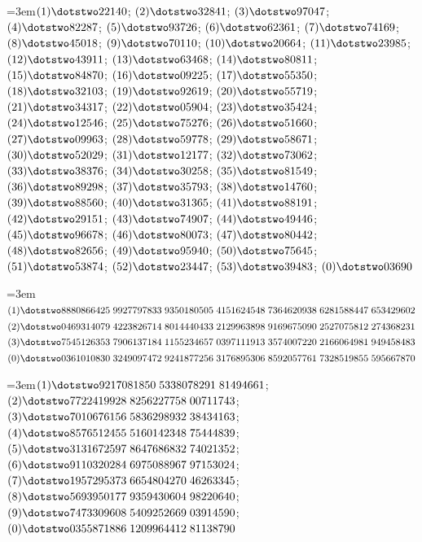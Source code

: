 \par\noindent\hangindent=3em\enspace $(1)\dotstwo22140$; $(2)\dotstwo32841$; $(3)\dotstwo97047$; $(4)\dotstwo82287$; $(5)\dotstwo93726$; $(6)\dotstwo62361$; $(7)\dotstwo74169$; $(8)\dotstwo45018$; $(9)\dotstwo70110$; $(10)\dotstwo20664$; $(11)\dotstwo23985$; $(12)\dotstwo43911$; $(13)\dotstwo63468$; $(14)\dotstwo80811$; $(15)\dotstwo84870$; $(16)\dotstwo09225$; $(17)\dotstwo55350$; $(18)\dotstwo32103$; $(19)\dotstwo92619$; $(20)\dotstwo55719$; $(21)\dotstwo34317$; $(22)\dotstwo05904$; $(23)\dotstwo35424$; $(24)\dotstwo12546$; $(25)\dotstwo75276$; $(26)\dotstwo51660$; $(27)\dotstwo09963$; $(28)\dotstwo59778$; $(29)\dotstwo58671$; $(30)\dotstwo52029$; $(31)\dotstwo12177$; $(32)\dotstwo73062$; $(33)\dotstwo38376$; $(34)\dotstwo30258$; $(35)\dotstwo81549$; $(36)\dotstwo89298$; $(37)\dotstwo35793$; $(38)\dotstwo14760$; $(39)\dotstwo88560$; $(40)\dotstwo31365$; $(41)\dotstwo88191$; $(42)\dotstwo29151$; $(43)\dotstwo74907$; $(44)\dotstwo49446$; $(45)\dotstwo96678$; $(46)\dotstwo80073$; $(47)\dotstwo80442$; $(48)\dotstwo82656$; $(49)\dotstwo95940$; $(50)\dotstwo75645$; $(51)\dotstwo53874$; $(52)\dotstwo23447$; $(53)\dotstwo39483$; $(0)\dotstwo03690$\par\smallskip

\par\noindent\hangindent=3em\enspace $(1)\dotstwo8880866425\;\allowbreak 9927797833\;\allowbreak 9350180505\;\allowbreak 4151624548\;\allowbreak 7364620938\;\allowbreak 6281588447\;\allowbreak 653429602$ $(2)\dotstwo0469314079\;\allowbreak 4223826714\;\allowbreak 8014440433\;\allowbreak 2129963898\;\allowbreak 9169675090\;\allowbreak 2527075812\;\allowbreak 274368231$ $(3)\dotstwo7545126353\;\allowbreak 7906137184\;\allowbreak 1155234657\;\allowbreak 0397111913\;\allowbreak 3574007220\;\allowbreak 2166064981\;\allowbreak 949458483$ $(0)\dotstwo0361010830\;\allowbreak 3249097472\;\allowbreak 9241877256\;\allowbreak 3176895306\;\allowbreak 8592057761\;\allowbreak 7328519855\;\allowbreak 595667870$\par\smallskip

\par\noindent\hangindent=3em\enspace $(1)\dotstwo9217081850\;\allowbreak 5338078291\;\allowbreak 81494661$; $(2)\dotstwo7722419928\;\allowbreak 8256227758\;\allowbreak 00711743$; $(3)\dotstwo7010676156\;\allowbreak 5836298932\;\allowbreak 38434163$; $(4)\dotstwo8576512455\;\allowbreak 5160142348\;\allowbreak 75444839$; $(5)\dotstwo3131672597\;\allowbreak 8647686832\;\allowbreak 74021352$; $(6)\dotstwo9110320284\;\allowbreak 6975088967\;\allowbreak 97153024$; $(7)\dotstwo1957295373\;\allowbreak 6654804270\;\allowbreak 46263345$; $(8)\dotstwo5693950177\;\allowbreak 9359430604\;\allowbreak 98220640$; $(9)\dotstwo7473309608\;\allowbreak 5409252669\;\allowbreak 03914590$; $(0)\dotstwo0355871886\;\allowbreak 1209964412\;\allowbreak 81138790$\par\smallskip


